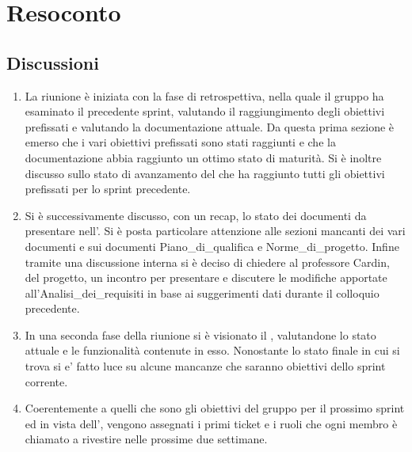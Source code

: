 \section{Resoconto} \label{sec:resoconto}
\subsection{Discussioni} \label{subsec:resdiscussione}
\begin{enumerate}
    \item La riunione è iniziata con la fase di retrospettiva, nella quale il gruppo ha esaminato il precedente sprint, valutando il raggiungimento degli obiettivi prefissati e valutando la documentazione attuale.
    Da questa prima sezione è emerso che i vari obiettivi prefissati sono stati raggiunti e che la documentazione abbia raggiunto un ottimo stato di maturità.  Si è inoltre discusso sullo stato di avanzamento del  che ha raggiunto tutti gli obiettivi prefissati per lo sprint precedente.
    \item Si è successivamente discusso, con un recap, lo stato dei documenti da presentare nell'. Si è posta particolare attenzione alle sezioni mancanti dei vari documenti e sui documenti Piano\_di\_qualifica e Norme\_di\_progetto. 
    Infine tramite una discussione interna si è deciso di chiedere al professore Cardin,  del progetto, un incontro per presentare e discutere le modifiche apportate all'Analisi\_dei\_requisiti in base ai suggerimenti dati durante il colloquio precedente.
    \item In una seconda fase della riunione si è visionato il , valutandone lo stato attuale e le funzionalità contenute in esso. Nonostante lo stato finale in cui si trova si e' fatto luce su alcune mancanze che saranno obiettivi dello sprint corrente.
    \item Coerentemente a quelli che sono gli obiettivi del gruppo per il prossimo sprint ed in vista dell', vengono assegnati i primi ticket e i ruoli che ogni membro è chiamato a rivestire nelle prossime due settimane.
\end{enumerate}

